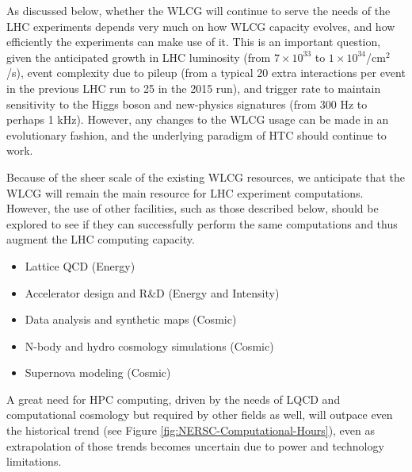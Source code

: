 As discussed below, whether the WLCG will continue to serve the needs of the LHC experiments depends very much on how WLCG capacity evolves, and how efficiently the experiments can make use of it.  This is an important question, given the anticipated growth in LHC luminosity (from $7 \times 10^{33}$ to $1 \times 10^{34}$/cm$^2$/s), event complexity due to pileup (from a typical 20 extra interactions per event in the previous LHC run to 25 in the 2015 run), and trigger rate to maintain sensitivity to the Higgs boson and new-physics signatures (from 300 Hz to perhaps 1 kHz).  However, any changes to the WLCG usage can be made in an evolutionary fashion, and the underlying paradigm of HTC should continue to work.

Because of the sheer scale of the existing WLCG resources, we anticipate that the WLCG will remain the main resource for LHC experiment computations.  However, the use of other facilities, such as those described below, should be explored to see if they can successfully perform the same computations and thus augment the LHC computing capacity.


\begin{itemize}
\item Lattice QCD (Energy)
\item Accelerator design and R\&D (Energy and Intensity)
\item Data analysis and synthetic maps (Cosmic)
\item N-body and hydro cosmology simulations (Cosmic)
\item Supernova modeling (Cosmic)
\end{itemize}

A great need for HPC computing, driven by the needs of LQCD and computational cosmology but required by other fields as well, will outpace even the historical trend (see Figure \ref{fig:NERSC-Computational-Hours}), even as extrapolation of those trends becomes uncertain due to power and technology limitations.

